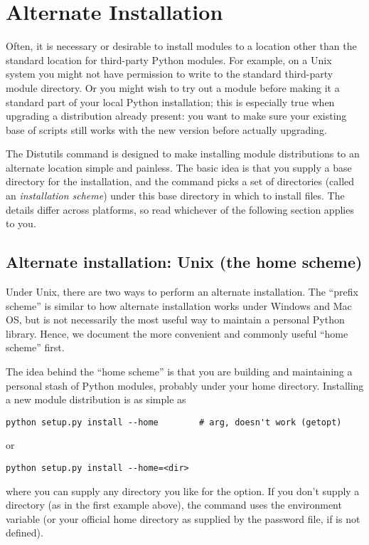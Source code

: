 \documentclass{howto}
\begin{document}
\section{Alternate Installation}
\label{sec:alt-install}

Often, it is necessary or desirable to install modules to a location
other than the standard location for third-party Python modules.  For
example, on a Unix system you might not have permission to write to the
standard third-party module directory.  Or you might wish to try out a
module before making it a standard part of your local Python
installation; this is especially true when upgrading a distribution
already present: you want to make sure your existing base of scripts
still works with the new version before actually upgrading.

The Distutils  command is designed to make installing
module distributions to an alternate location simple and painless.  The
basic idea is that you supply a base directory for the installation, and
the  command picks a set of directories (called an
\emph{installation scheme}) under this base directory in which to
install files.  The details differ across platforms, so read whichever
of the following section applies to you.


\subsection{Alternate installation: Unix (the home scheme)}
\label{sec:alt-unix-prefix}

Under Unix, there are two ways to perform an alternate installation.
The ``prefix scheme'' is similar to how alternate installation works
under Windows and Mac OS, but is not necessarily the most useful way to
maintain a personal Python library.  Hence, we document the more
convenient and commonly useful ``home scheme'' first.

The idea behind the ``home scheme'' is that you are building and
maintaining a personal stash of Python modules, probably under your home 
directory.  Installing a new module distribution is as simple as
\begin{verbatim}
python setup.py install --home        # arg, doesn't work (getopt)
\end{verbatim}
or
\begin{verbatim}
python setup.py install --home=<dir>
\end{verbatim}
where you can supply any directory you like for the 
option.  If you don't supply a directory (as in the first example
above), the  command uses the  environment
variable (or your official home directory as supplied by the password
file, if  is not defined).
\end{document}
